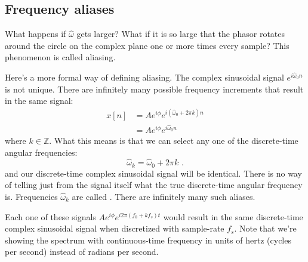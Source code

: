 \subsection{Frequency aliases}
What happens if $\hat{\omega}$ gets larger? What if it is so large that the phasor rotates around the circle on the complex plane one or more times every sample? This phenomenon is called aliasing.

Here's a more formal way of defining aliasing. The complex sinusoidal
signal $e^{i\hat{\omega}_0 n}$ is not unique. There are infinitely
many possible frequency increments that result in the same signal:
\begin{align}
x[n]    &=Ae^{i\phi} e^{i(\hat{\omega}_0 + 2\pi k) n}\\
&=Ae^{i\phi} e^{i \hat{\omega}_0  n}
\end{align}
where $k\in\mathbb{Z}$. What this means is that we can select any one
of the discrete-time angular frequencies:
\begin{equation}
  \boxed{
    \hat{\omega}_k = \hat{\omega}_0 + 2\pi k
    }\,\,.
\end{equation}
and our discrete-time complex sinusoidal signal will be
identical. There is no way of telling just from the signal itself what
the true discrete-time angular frequency is. Frequencies
$\hat{\omega}_k$ are called \emph{}. There are
infinitely many such aliases.

\begin{marginfigure}[5cm]
\begin{center}
\end{center}
\caption{Each one of these signals $Ae^{i\phi}e^{i2\pi (f_0 + k f_s)t}$
  would result in the same discrete-time complex sinusoidal signal
  when discretized with sample-rate $f_s$. Note that we're showing the
  spectrum with continuous-time frequency in units of hertz (cycles
  per second) instead of radians per second.}
\end{marginfigure}

